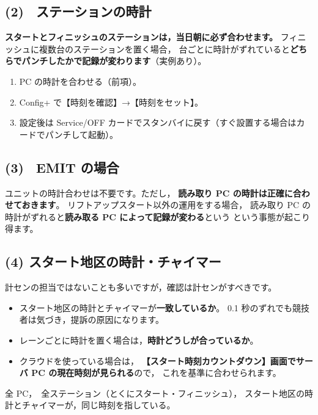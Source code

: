 \subsection*{(2) \tSI\ ステーションの時計}

\textbf{スタートとフィニッシュのステーションは，当日朝に必ず合わせます。}
フィニッシュに複数台のステーションを置く場合，
台ごとに時計がずれていると\textbf{どちらでパンチしたかで記録が変わります}（実例あり）。

\begin{enumerate}
\item PC の時計を合わせる（前項）。
\item Config+ で【時刻を確認】→【時刻をセット】。
\item 設定後は Service/OFF カードでスタンバイに戻す（すぐ設置する場合はカードでパンチして起動）。
\end{enumerate}

\subsection*{(3) \tEMIT\ EMIT の場合}

ユニットの時計合わせは不要です。ただし，
\textbf{読み取り PC の時計は正確に合わせておきます}。
リフトアップスタート以外の運用をする場合，
読み取り PC の時計がずれると\textbf{読み取る PC によって記録が変わる}という
という事態が起こり得ます。

\subsection*{(4) スタート地区の時計・チャイマー}

計センの担当ではないことも多いですが，確認は計センがすべきです。

\begin{itemize}
\item スタート地区の時計とチャイマーが\textbf{一致しているか}。
      0.1 秒のずれでも競技者は気づき，提訴の原因になります。
\item レーンごとに時計を置く場合は，\textbf{時計どうしが合っているか}。
\item クラウドを使っている場合は，
      \textbf{【スタート時刻カウントダウン】画面でサーバ PC の現在時刻が見られる}ので，
      これを基準に合わせられます。
\end{itemize}

\begin{Done}
全 PC，\tSI\ 全ステーション（とくにスタート・フィニッシュ），
スタート地区の時計とチャイマーが，同じ時刻を指している。
\end{Done}

